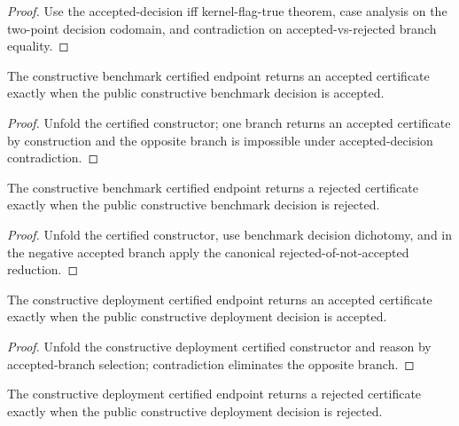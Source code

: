 \begin{proof}
Use the accepted-decision iff kernel-flag-true theorem, case analysis on the two-point decision codomain, and contradiction on accepted-vs-rejected branch equality.
\end{proof}

\begin{theorem}
\label{thm:definitive-benchmark-certified-accepted-iff-decision-accepted}
The constructive benchmark certified endpoint returns an accepted certificate exactly when the public constructive benchmark decision is accepted.
\end{theorem}

\begin{proof}
Unfold the certified constructor; one branch returns an accepted certificate by construction and the opposite branch is impossible under accepted-decision contradiction.
\end{proof}

\begin{theorem}
\label{thm:definitive-benchmark-certified-rejected-iff-decision-rejected}
The constructive benchmark certified endpoint returns a rejected certificate exactly when the public constructive benchmark decision is rejected.
\end{theorem}

\begin{proof}
Unfold the certified constructor, use benchmark decision dichotomy, and in the negative accepted branch apply the canonical rejected-of-not-accepted reduction.
\end{proof}

\begin{theorem}
\label{thm:definitive-deployment-certified-accepted-iff-decision-accepted}
The constructive deployment certified endpoint returns an accepted certificate exactly when the public constructive deployment decision is accepted.
\end{theorem}

\begin{proof}
Unfold the constructive deployment certified constructor and reason by accepted-branch selection; contradiction eliminates the opposite branch.
\end{proof}

\begin{theorem}
\label{thm:definitive-deployment-certified-rejected-iff-decision-rejected}
The constructive deployment certified endpoint returns a rejected certificate exactly when the public constructive deployment decision is rejected.
\end{theorem}

